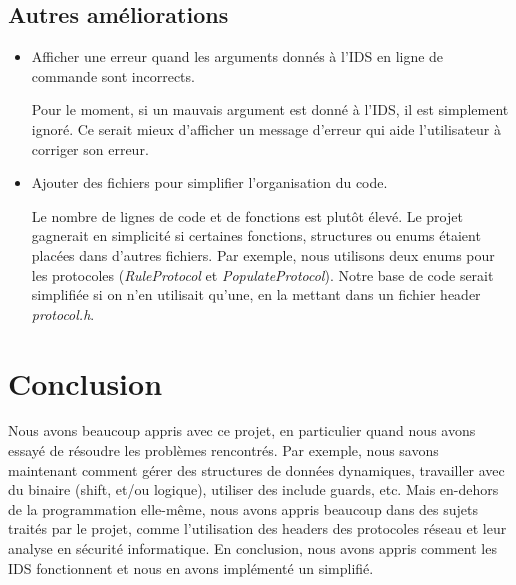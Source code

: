 \documentclass[a4paper]{article}
\begin{document}
\subsection{Autres améliorations}



\begin{itemize}
    \item Afficher une erreur quand les arguments donnés à l'IDS en ligne de commande sont incorrects.
    \begin{example}
        Pour le moment, si un mauvais argument est donné à l'IDS, il est simplement ignoré. Ce serait mieux d'afficher un message d'erreur qui aide l'utilisateur à corriger son erreur.
    \end{example}
    \item Ajouter des fichiers pour simplifier l'organisation du code.
    \begin{example}
        Le nombre de lignes de code et de fonctions est plutôt élevé. Le projet gagnerait en simplicité si certaines fonctions, structures ou enums étaient placées dans d'autres fichiers. Par exemple, nous utilisons deux enums pour les protocoles (\textit{RuleProtocol} et \textit{PopulateProtocol}). Notre base de code serait simplifiée si on n'en utilisait qu'une, en la mettant dans un fichier header \textit{protocol.h}.
    \end{example}
\end{itemize}










\section{Conclusion}



Nous avons beaucoup appris avec ce projet, en particulier quand nous avons essayé de résoudre les problèmes rencontrés. Par exemple, nous savons maintenant comment gérer des structures de données dynamiques, travailler avec du binaire (shift, et/ou logique), utiliser des include guards, etc. Mais en-dehors de la programmation elle-même, nous avons appris beaucoup dans des sujets traités par le projet, comme l'utilisation des headers des protocoles réseau et leur analyse en sécurité informatique. En conclusion, nous avons appris comment les IDS fonctionnent et nous en avons implémenté un simplifié.
\end{document}
